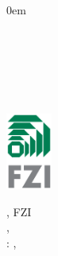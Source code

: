 \pagestyle{empty}
\begingroup
{}
\renewcommand{\baselinestretch}{1}

\begin{titlepage}
  \parindent 0em 
  \LARGE\textbf{\floatingtitle}
  \vspace{24pt}\\
  \\
  \myname \\[1.5cm]
  \begin{center}
  \titlefig\\[1cm]
  \end{center}
  \vfill
  \begin{minipage}{0.4\textwidth}
    \begin{flushleft} \large
      \LARGE\textbf{\thesistype}\\
      \LARGE\releasemonth
    \end{flushleft}
  \end{minipage}
  \begin{minipage}{0.6\textwidth}
    \begin{flushright}
      \includegraphics[width=1.5cm]{graphics/FZI-Logo}
    \end{flushright}
  \end{minipage}
  \newpage
  \small \thesistype, FZI\\
  \department, \releaseyear\\
  : \reviewerone, \reviewertwo
  \vfill
  \fzidepartment\\
  \fziname
  \newpage
\end{titlepage}

\endgroup
